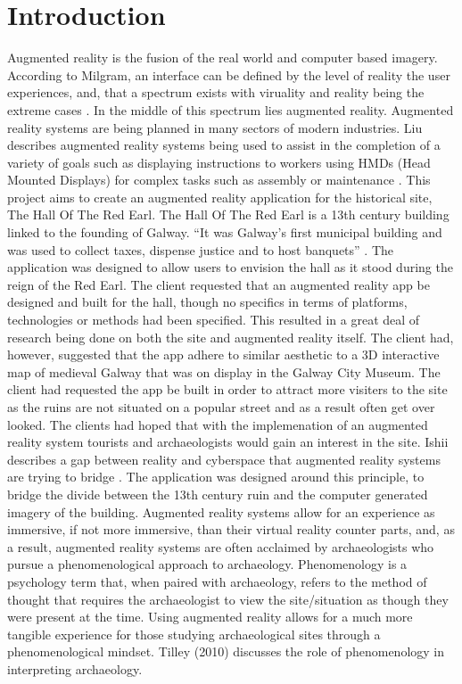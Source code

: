 \chapter{Introduction}
Augmented reality is the fusion of the real world and computer based imagery. According to Milgram, an interface can be defined by the level of reality the user experiences, and, that a spectrum exists with viruality and reality being the extreme cases \cite{SPIE}.
In the middle of this spectrum lies augmented reality. Augmented reality systems are being planned in many sectors of modern industries. Liu describes augmented reality systems being used to assist in the completion of a variety of goals such as displaying instructions to workers using HMDs (Head Mounted Displays) for complex tasks such as assembly or maintenance \cite{SIGCHI}.
This project aims to create an augmented reality application for the historical site, The Hall Of The Red Earl.
The Hall Of The Red Earl is a 13th century building linked to the founding of Galway. “It was Galway’s first municipal building and was used to collect taxes, dispense justice and to host banquets” \cite{dng}. The application was designed to allow users to envision the hall as it stood during the reign of the Red Earl.
The client requested that an augmented reality app be designed and built for the hall, though no specifics in terms of platforms, technologies or methods had been specified. This resulted in a great deal of research being done on both the site and augmented reality itself. The client had, however, suggested that the app adhere to similar aesthetic to a 3D interactive map of medieval Galway that was on display in the Galway City Museum. The client had requested the app be built in order to attract more visiters to the site as the ruins are not situated on a popular street and as a result often get over looked. The clients had hoped that with the implemenation of an augmented reality system tourists and archaeologists would gain an interest in the site.
Ishii describes a gap between reality and cyberspace that augmented reality systems are trying to bridge \cite{tangibleBits}. The application was designed around this principle, to bridge the divide between the 13th century ruin and the computer generated imagery of the building. Augmented reality systems allow for an experience as immersive, if not more immersive, than their virtual reality counter parts, and, as a result, augmented reality systems are often acclaimed by archaeologists who pursue a phenomenological approach to archaeology. Phenomenology is a psychology term that, when paired with archaeology, refers to the method of thought that requires the archaeologist to view the site/situation as though they were present at the time. Using augmented reality allows for a much more tangible experience for those studying archaeological sites through a phenomenological mindset. Tilley (2010) discusses the role of phenomenology in interpreting archaeology.

